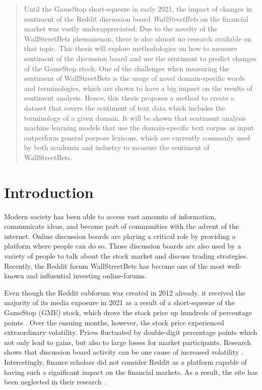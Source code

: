 \documentclass[11pt, a4paper]{article}
\begin{document}


\begin{abstract}
    Until the GameStop short-squeeze in early 2021, the impact of changes in sentiment of the Reddit discussion board \emph{WallStreetBets} on the financial market 
    was vastly underappreciated. 
    Due to the novelty of the WallStreetBets phenomenon, there is also almost no research available on that topic.
    This thesis will explore methodologies on how to measure sentiment of the discussion board and use the sentiment to predict changes of the GameStop stock.
    One of the challenges when measuring the sentiment of WallStreetBets is the usage of novel 
    domain-specific words and terminologies, which are shown to have a big impact on the results of sentiment analysis. Hence, this thesis proposes a method 
    to create a dataset that covers the sentiment of text data which includes the terminology of a given domain. It will be shown that sentiment analysis machine 
    learning models that use the domain-specific text corpus as input outperform general purpose lexicons, which are currently commonly used by both academia and industry 
    to measure the sentiment of WallStreetBets. %
\end{abstract}

\section{Introduction} \label{sec:introduction}

Modern society has been able to access vast amounts of information, communicate ideas, and become part of communities with the advent of the internet. 
Online discussion boards are playing a critical role by providing a platform where people can do so. Those discussion boards are also used by a 
variety of people to talk about the stock market and discuss trading strategies. Recently, the Reddit forum WallStreetBets has become one of 
the most well-known and influential investing online-forums.

Even though the Reddit subforum was created in 2012 already, it received the majority of its media exposure in 2021 as a result of a short-squeeze 
of the GameStop (GME) stock, which drove the stock price up hundreds of percentage points \citep{diangson2021betonreddit}. Over the ensuing months, however, 
the stock price experienced extraordinary volatility. Prices fluctuated by double-digit percentage points which not only lead to gains, but also to large losses
for market participants. Research shows that discussion board activity can be one cause of increased volatility \citep{das2007yahoo}.
Interestingly, finance scholars did not consider Reddit as a platform capable of having such a significant impact on the financial markets. 
As a result, the site has been neglected in their research \citep{long2021LikeTheStock}.
\end{document}
